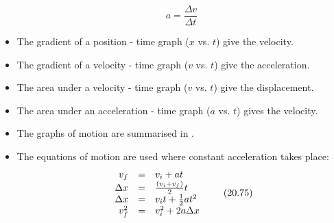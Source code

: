 \begin{itemize}[noitemsep]
\label{m38796*id80925}\nopagebreak\noindent{}
    \begin{equation}
    a=\frac{\Delta v}{\Delta t}\tag{20.74}
      \end{equation}
    \label{m38796*uid166}\item The gradient of a position - time graph ($x$ vs. $t$) give the velocity.
\label{m38796*uid167}\item The gradient of a velocity - time graph ($v$ vs. $t$) give the acceleration.
\label{m38796*uid168}\item The area under a velocity - time graph ($v$ vs. $t$) give the displacement.
\label{m38796*uid169}\item The area under an acceleration - time graph ($a$ vs. $t$) gives the velocity.
\label{m38796*uid170}\item The graphs of motion are summarised in .
\label{m38796*uid171}\item The equations of motion are used where constant acceleration takes place:
\label{m38796*id81101}\nopagebreak\noindent{}
    \begin{equation}
    \begin{array}{ccc}\hfill {v}_{f}& =& {v}_{i}+at\hfill \\ \hfill \Delta x& =& \frac{\left({v}_{i}+{v}_{f}\right)}{2}t\hfill \\ \hfill \Delta x& =& {v}_{i}t+\frac{1}{2}a{t}^{2}\hfill \\ \hfill v_{f}^{2}& =& v_{i}^{2}+2a\Delta x\hfill \end{array}\tag{20.75}
      \end{equation}
    \end{itemize}
    \label{m38796*cid13}
